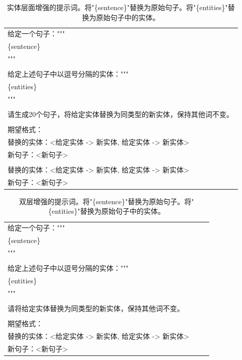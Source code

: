 \documentclass[supercite]{Experimental_Report}
\theoremstyle{definition}
\begin{document}
\begin{table}[ht]
\centering
    \begin{tabular}{m{0.92\linewidth}}
    \toprule

给定一个句子："""\\
\{sentence\}\\
"""\\
\\
给定上述句子中以逗号分隔的实体："""\\
\{entities\}\\
"""\\
\\
请生成20个句子，将给定实体替换为同类型的新实体，保持其他词不变。\\
\\
期望格式：\\
替换的实体：<给定实体 -> 新实体, 给定实体 -> 新实体>\\
新句子：<新句子>\\
\\
替换的实体：<给定实体 -> 新实体, 给定实体 -> 新实体>\\
新句子：<新句子>\\ 
\bottomrule
\end{tabular}
\caption{实体层面增强的提示词。将"\{sentence\}"替换为原始句子。将"\{entities\}"替换为原始句子中的实体。}
\label{tab:prompts-entity}
\end{table}

\begin{table}[ht]
\centering
    \begin{tabular}{m{0.92\linewidth}}
    \toprule
给定一个句子："""\\
\{sentence\}\\
"""\\
\\
给定上述句子中以逗号分隔的实体："""\\
\{entities\}\\
"""\\
\\
请将给定实体替换为同类型的新实体，保持其他词不变。\\
\\
期望格式：\\
替换的实体：<给定实体 -> 新实体, 给定实体 -> 新实体>\\
新句子：<新句子>\\ \bottomrule
\end{tabular}
\caption{双层增强的提示词。将"\{sentence\}"替换为原始句子。将"\{entities\}"替换为原始句子中的实体。}
\label{tab:prompts-both}
\end{table}
\end{document}
